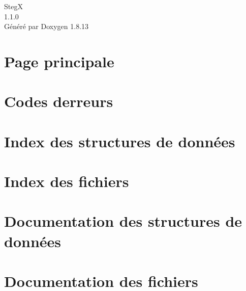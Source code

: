 \documentclass[twoside]{article}
\newcommand{\+}{\discretionary{\mbox{\scriptsize$\hookleftarrow$}}{}{}}
\newcommand{\clearemptydoublepage}{%
  \newpage{\pagestyle{empty}\cleardoublepage}%
}
\begin{document}
\hypersetup{pageanchor=false,
             bookmarksnumbered=true,
             pdfencoding=unicode
            }
\begin{titlepage}
\vspace*{7cm}
\begin{center}%
{\Large StegX \\[1ex]\large 1.\+1.\+0 }\\
\vspace*{1cm}
{\large Généré par Doxygen 1.8.13}\\
\end{center}
\end{titlepage}
\tableofcontents
{}
\hypersetup{pageanchor=true}

\section{Page principale}
\label{index}\hypertarget{index}{}
\section{Codes d\textquotesingle{}erreurs}
\label{a00134}

\section{Index des structures de données}

\section{Index des fichiers}

\section{Documentation des structures de données}











\section{Documentation des fichiers}












































\newpage
{}
\clearemptydoublepage
{}
\printindex
\end{document}

